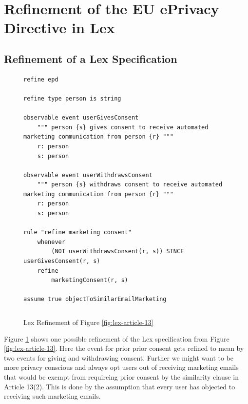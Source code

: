 \section{Refinement of the EU ePrivacy Directive in Lex}
\label{section:lex-pretix-refinement}


\subsection{Refinement of a Lex Specification}
\begin{figure}
\begin{minipage}{0.48\textwidth}
\begin{lstlisting}
refine epd

refine type person is string

observable event userGivesConsent
    """ person {s} gives consent to receive automated marketing communication from person {r} """
    r: person
    s: person

observable event userWithdrawsConsent
    """ person {s} withdraws consent to receive automated marketing communication from person {r} """
    r: person
    s: person

rule "refine marketing consent"
    whenever
        (NOT userWithdrawsConsent(r, s)) SINCE userGivesConsent(r, s)
    refine
        marketingConsent(r, s)

assume true objectToSimilarEmailMarketing
\end{lstlisting}
\end{minipage}
\hspace{10pt}
\begin{minipage}{0.48\textwidth}
\begin{lstlisting}[firstnumber=35]

\end{lstlisting}
\end{minipage}
\caption{Lex Refinement of Figure
\ref{fig:lex-article-13} \label{fig:rex-article-13}}
\end{figure}

Figure \ref{fig:rex-article-13} shows one possible refinement
of the Lex specification from Figure \ref{fig:lex-article-13}.
Here the event for prior prior consent gets refined to mean
by two events for giving and withdrawing consent.
Further we might want to be more privacy conscious
and always opt users out of receiving
marketing emails that would be exempt from requireing prior 
consent by the similarity clause in Article 13(2).
This is done by the assumption that every user has objected
to receiving such marketing emails.


